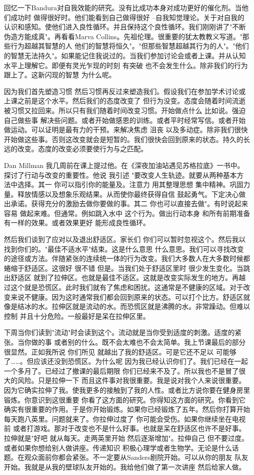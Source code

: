 回忆一下Bandura对自我效能的研究。没有比成功本身对成功更好的催化剂。当他们成功时 做得很好时。他们能看到自己做得很好 --自我知觉理论。关于对自我的认识和感知。使他们进入良性循环。并且保持这个良性循环。我们刚刚讲了"不断伪造方能成真"。再看看Marva Collins。先祖伦理。很重要的犹太教教义写道。"那些行为超越其智慧的人 他们的智慧将恒久"。"但那些智慧超越其行为的人"。"他们的智慧无法持久"。如果能记住我说过的。当我们参加讨论会或者上课。并从认知水平上理解它。即便有灵光乍现的时刻 有突破 也不会发生什么。除非我们的行为跟上了。这新闪现的智慧 为什么呢。 

因为我们首先塑造习惯 然后习惯再反过来塑造我们。假设我们在参加学术讨论或上课之前是这个水平。然后我们的态度改变了 但行为没变。态度会随着时间流逝被习惯又拉回来。所以只有我们随着时间改变习惯。开始做点什么 比如说。强迫自己做些事 解决些问题。或者开始做感恩的训练。或者平时经常写信。或者开始做运动。可以证明是最有力的干预。来解决焦虑 沮丧 以及多动症。除非我们很快开始做这些事。否则这改变就会是短暂的。我们很快会回到原来的状态。持久的长远的改变。态度的改变必须要使行为与之匹配。 

Dan Millman 我几周前在课上提过他。在《深夜加油站遇见苏格拉底》一书中。探讨了行动与改变的重要性。他说 我引述 "要改变人生轨迹。就要从两种基本方法中选择。其一 你可以指引你的能量及。注意力 用其整理思想 集中精神。巩固力量。释放情感以及想象乐观结果。从而使你最终获得自信 鼓起勇气。下定决心做出承诺。获得充分的激励去做你要做的事。其二 你也可以直接去做"。有时说起来容易 做起来难。但通常。例如跳入水中 这个行为。做出行动本身 和所有前期准备有一样的效果。或者效果更好 能形成良性循环。 

然后我们谈到了应对以及退出舒适区。家长们 你们可以暂时忽视这个。然后我以找到你们的。"最佳不适水平"结束。这是什么意思 什么意思。我们可以寻找改变的途径或方法。伴随紧张的连续统一体的行为改变。我们大多数人在大多数时候都蜷缩于舒适区。这很好 很不错 但是。当我们处于舒适区里时 很少发生变化。当跳出舒适区 就到了拉伸区。也就是最佳不适区。这就是改变实际发生的地方。再越过这个就是恐慌区。此时我们就有了焦虑和困扰。这通常是不健康的区域。对于改变来说不健康。因为这时通常我们都会回到原来的状态。可以打个比方。舒适区就像是结冰的水。拉伸区就是流动的水。而恐慌区就是沸腾的水。非常躁动。但难以控制 并且十分危险。一般最好是呆在拉伸区里。 

下周当你们读到"流动"时会读到这个。流动就是当你受到适度的刺激。适度的紧张。当你做的事 或者别的什么。既不会太难也不会太简单。我上节课最后的部分 很显然。正如我所说 你们所见 就越出了我的舒适区。可是它还不足以 可能够了……。但应该还没到恐慌区。为什么呢 因为我已经认识你们了。我们已经在一起一个多月了。已经过了撤课的最后期限 你们已经来不及了。所以我也不是冒了很大的风险。只是拉伸一下 而且这件事对我很重要。我是说对我个人来说很重要。因为它确实拉伸了我。使我更多的接触到了我的人性。或者比方说你要在健身房里锻炼。你意识到这很重要 你看了这方面的研究。你得知这方面的研究。你看到它确实有很重要的作用。于是你开始锻炼。如果你已经锻炼了五年。然后你打算开始每天跑八英里。问题就来了。你拉伸过度了 你可能会受伤。如果你继续坐在电视前 或者打游戏。那对于改变也不是什么好事。也就是呆在舒适区也许不是好事。拉伸就是"好吧 就从每天。走两英里开始 然后逐渐增加"。拉伸自己 但不要过度。或者如果你想给别人做讲座。传递知识 积极心理学或者生物学。无论是什么话题。在观众面前你都会紧张。不一定要从Sanders剧院开始。可以从你的朋友 队友开始。我就是从我的壁球队友开始的。我给他们做了第一次讲座 然后给家人做。 

